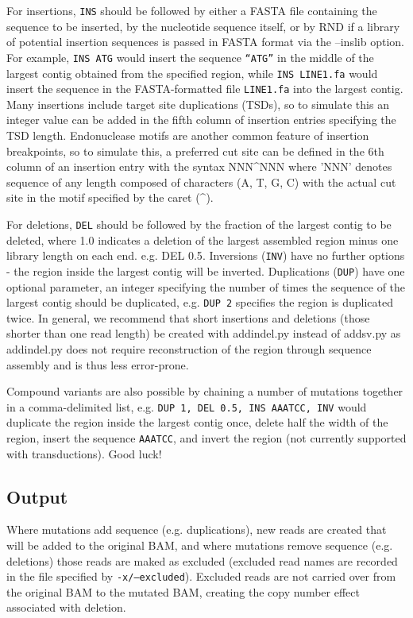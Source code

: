 \documentclass[letterpaper,11pt]{article}
\begin{document}
    For insertions, \texttt{INS} should be followed by either a FASTA file containing the sequence to be inserted, by the nucleotide sequence itself, or by RND if a library of potential insertion sequences is passed in FASTA format via the --inslib option. For example, \texttt{INS ATG} would insert the sequence \texttt{``ATG''} in the middle of the largest contig obtained from the specified region, while \texttt{INS LINE1.fa} would insert the sequence in the FASTA-formatted file \texttt{LINE1.fa} into the largest contig. Many insertions include target site duplications (TSDs), so to simulate this an integer value can be added in the fifth column of insertion entries specifying the TSD length. Endonuclease motifs are another common feature of insertion breakpoints, so to simulate this, a preferred cut site can be defined in the 6th column of an insertion entry with the syntax NNN\^{}NNN where 'NNN' denotes sequence of any length composed of characters (A, T, G, C) with the actual cut site in the motif specified by the caret (\^{}).
    
    For deletions, \texttt{DEL} should be followed by the fraction of the largest contig to be deleted, where 1.0 indicates a deletion of the largest assembled region minus one library length on each end. e.g. {DEL 0.5}. Inversions (\texttt{INV}) have no further options - the region inside the largest contig will be inverted. Duplications (\texttt{DUP}) have one optional parameter, an integer specifying the number of times the sequence of the largest contig should be duplicated, e.g. \texttt{DUP 2} specifies the region is duplicated twice. In general, we recommend that short insertions and deletions (those shorter than one read length) be created with addindel.py instead of addsv.py as addindel.py does not require reconstruction of the region through sequence assembly and is thus less error-prone.

    Compound variants are also possible by chaining a number of mutations together in a comma-delimited list, e.g. \texttt{DUP 1, DEL 0.5, INS AAATCC, INV} would duplicate the region inside the largest contig once, delete half the width of the region, insert the sequence \texttt{AAATCC}, and invert the region (not currently supported with transductions). Good luck!

\subsection{Output}
    Where mutations add sequence (e.g. duplications), new reads are created that will be added to the original BAM, and where mutations remove sequence (e.g. deletions) those reads are maked as excluded (excluded read names are recorded in the file specified by \texttt{-x/--excluded}). Excluded reads are not carried over from the original BAM to the mutated BAM, creating the copy number effect associated with deletion.
    
\end{document}
